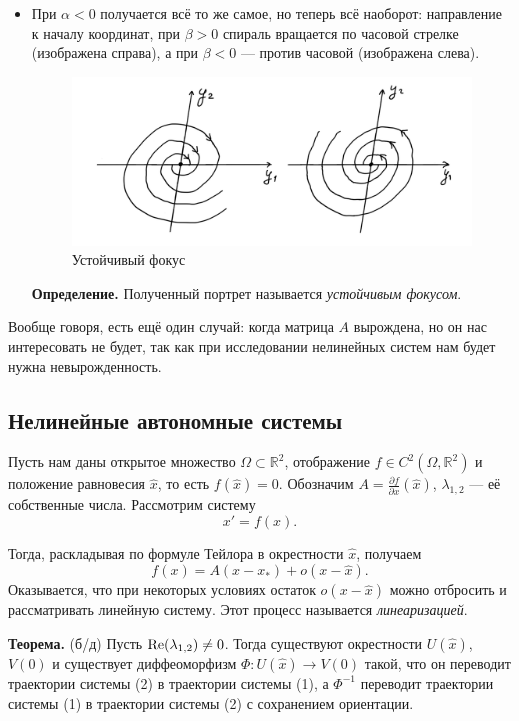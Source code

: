 \begin{itemize}
\item При $\alpha < 0$ получается всё то же самое, но теперь всё наоборот: направление к началу координат, при $\beta > 0$ спираль вращается по часовой стрелке (изображена справа), а при $\beta < 0$ --- против часовой (изображена слева).
\pagebreak
\begin{figure}[h]
    \includegraphics[scale=0.25]{stable-focus}
    \centering
    \caption{Устойчивый фокус}
\end{figure}

\textbf{Определение.} Полученный портрет называется \textit{устойчивым фокусом}.
\end{itemize}

Вообще говоря, есть ещё один случай: когда матрица $A$ вырождена, но он нас интересовать не будет, так как при исследовании нелинейных систем нам будет нужна невырожденность.

\subsection{Нелинейные автономные системы}
Пусть нам даны открытое множество $\Omega \subset \mathbb R^2$, отображение $f \in C^2(\Omega, \mathbb R^2)$ и положение равновесия $\widehat{x}$, то есть $f(\widehat{x}) = 0$. Обозначим $A = \frac{\partial f}{\partial x}(\widehat{x})$, $\lambda_{1, 2}$ --- её собственные числа.
Рассмотрим систему
\begin{equation}
    x' = f(x).
\end{equation}

Тогда, раскладывая по формуле Тейлора в окрестности $\widehat{x}$, получаем
\[
    f(x) = A(x - x_*) + o(x - \widehat{x}).
\]
Оказывается, что при некоторых условиях остаток $o(x - \widehat{x})$ можно отбросить и рассматривать линейную систему. Этот процесс называется \textit{линеаризацией}.

\textbf{Теорема.} (б/д) Пусть $\operatorname{Re}(\lambda_{1, 2}) \ne 0$. Тогда существуют окрестности $U(\widehat{x})$, $V(0)$ и существует диффеоморфизм
$\Phi\colon U(\widehat{x}) \to V(0)$ такой, что он переводит траектории системы (2) в траектории системы (1), а $\Phi^{-1}$ переводит траектории системы (1) в траектории системы (2) с сохранением ориентации.

